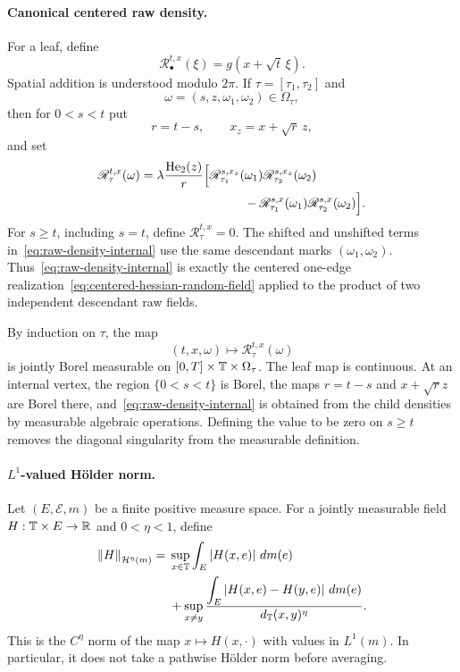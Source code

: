 \paragraph{Canonical centered raw density.}
For a leaf, define
\begin{equation}
  \mathscr R_\bullet^{t,x}(\xi)
  =
  g(x+\sqrt t\,\xi).
  \label{eq:raw-density-leaf}
\end{equation}
Spatial addition is understood modulo $2\pi$. If $\tau=[\tau_1,\tau_2]$ and
\begin{equation*}
  \omega=(s,z,\omega_1,\omega_2)\in\Omega_\tau,
\end{equation*}
then for $0<s<t$ put
\begin{equation*}
  r=t-s,
  \qquad
  x_z=x+\sqrt r\,z,
\end{equation*}
and set
\begin{align}
  \mathscr R_\tau^{t,x}(\omega)
  ={}&
  \lambda\frac{\operatorname{He}_2(z)}r
  \Bigl[
    \mathscr R_{\tau_1}^{s,x_z}(\omega_1)
    \mathscr R_{\tau_2}^{s,x_z}(\omega_2)
  \notag\\
  &\hspace{7em}-
    \mathscr R_{\tau_1}^{s,x}(\omega_1)
    \mathscr R_{\tau_2}^{s,x}(\omega_2)
  \Bigr].
  \label{eq:raw-density-internal}
\end{align}
For $s\geq t$, including $s=t$, define $\mathscr R_\tau^{t,x}=0$. The shifted and unshifted terms in~\eqref{eq:raw-density-internal} use the same descendant marks $(\omega_1,\omega_2)$. Thus~\eqref{eq:raw-density-internal} is exactly the centered one-edge realization~\eqref{eq:centered-hessian-random-field} applied to the product of two independent descendant raw fields.

By induction on $\tau$, the map
\begin{equation*}
  (t,x,\omega)
  \longmapsto
  \mathscr R_\tau^{t,x}(\omega)
\end{equation*}
is jointly Borel measurable on $[0,T]\times\mathbb T\times\Omega_\tau$. The leaf map is continuous. At an internal vertex, the region $\{0<s<t\}$ is Borel, the maps $r=t-s$ and $x+\sqrt r z$ are Borel there, and~\eqref{eq:raw-density-internal} is obtained from the child densities by measurable algebraic operations. Defining the value to be zero on $s\geq t$ removes the diagonal singularity from the measurable definition.

\paragraph{$L^1$-valued H\"older norm.}
Let $(E,\mathcal E,m)$ be a finite positive measure space. For a jointly measurable field $H:\mathbb T\times E\to\mathbb R$ and $0<\eta<1$, define
\begin{align}
  \left\lVert H\right\rVert_{\mathcal H^\eta(m)}
  ={}&
  \sup_{x\in\mathbb T}\int_E\left|H(x,e)\right|\,dm(e)
  \notag\\
  &+
  \sup_{x\neq y}
  \frac{
    \displaystyle
    \int_E\left|H(x,e)-H(y,e)\right|\,dm(e)
  }{d_\mathbb T(x,y)^\eta}.
  \label{eq:L1-valued-holder}
\end{align}
This is the $C^\eta$ norm of the map $x\mapsto H(x,\cdot)$ with values in $L^1(m)$. In particular, it does not take a pathwise H\"older norm before averaging.

